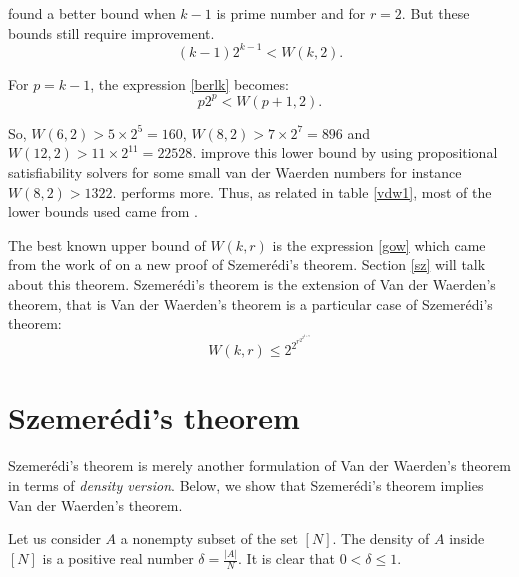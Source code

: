 \cite{brk1968} found a better bound when $k-1$ is prime number  and for $r=2$. But these bounds still  require improvement. 
 \begin{equation}
 (k-1)2^{k-1}<W(k,2). \label{berlk}
 \end{equation}

For $p=k-1$, the expression \eqref{berlk} becomes:
 \begin{equation}
 p2^{p}<W(p+1,2). \label{berlk1}
\end{equation}

So, $W(6,2) >5 \times 2^5=160$, $W(8,2) >7 \times 2^7= 896$ and $W(12,2) >11 \times 2^11= 22528.$
\citep{dransfield2004} improve this lower bound by using propositional satisfiability solvers  for some small van der Waerden numbers for instance $W( 8,2) > 1322$. \cite{rabung2012} performs more. Thus, as related in table \eqref{vdw1}, most of the lower bounds used came from \cite{rabung2012}.

The best known upper bound of $W(k,r)$ is the expression  \eqref{gow} which came from the work of \cite{gowers2001new} on a  new proof of Szemerédi's theorem. Section \eqref{sz} will talk about this theorem. Szemerédi's theorem is the extension of Van der Waerden's theorem, that is Van der Waerden's theorem is a particular case of Szemerédi's theorem:
\begin{equation}
W(k,r) \leq 2^{2^{r^{2^{2^{k+9}}}}}     \label{gow}
\end{equation}



\section{Szemerédi's theorem} \label{sz}

Szemerédi's theorem is merely another formulation of Van der Waerden's theorem in terms of \textit{density version}. Below, we show that Szemerédi's theorem implies Van der Waerden's theorem.

Let us consider $A$ a nonempty subset of the set $[N]$. The density of $A$ inside $[N]$ is a positive real number $\delta=\frac{|A|}{N}$. It is clear that $0< \delta \leq 1.$ 

